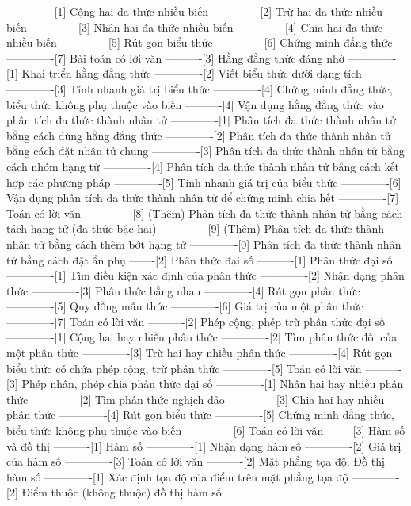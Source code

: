 -------------[1] Cộng hai đa thức nhiều biến
-------------[2] Trừ hai đa thức nhiều biến
-------------[3] Nhân hai đa thức nhiều biến
-------------[4] Chia hai đa thức nhiều biến
-------------[5] Rút gọn biểu thức
-------------[6] Chứng minh đẳng thức
-------------[7] Bài toán có lời văn
----------[3] Hằng đẳng thức đáng nhớ
-------------[1] Khai triển hằng đẳng thức
-------------[2] Viết biểu thức dưới dạng tích
-------------[3] Tính nhanh giá trị biểu thức
-------------[4] Chứng minh đẳng thức, biểu thức không phụ thuộc vào biến
----------[4] Vận dụng hằng đẳng thức vào phân tích đa thức thành nhân tử
-------------[1] Phân tích đa thức thành nhân tử bằng cách dùng hằng đẳng thức
-------------[2] Phân tích đa thức thành nhân tử bằng cách đặt nhân tử chung
-------------[3] Phân tích đa thức thành nhân tử bằng cách nhóm hạng tử
-------------[4] Phân tích đa thức thành nhân tử bằng cách kết hợp các phương pháp
-------------[5] Tính nhanh giá trị của biểu thức
-------------[6] Vận dụng phân tích đa thức thành nhân tử để chứng minh chia hết
-------------[7] Toán có lời văn
-------------[8] (Thêm) Phân tích đa thức thành nhân tử bằng cách tách hạng tử (đa thức bậc hai)
-------------[9] (Thêm) Phân tích đa thức thành nhân tử bằng cách thêm bớt hạng tử
-------------[0] Phân tích đa thức thành nhân tử bằng cách đặt ẩn phụ
-------[2] Phân thức đại số
----------[1] Phân thức đại số
-------------[1] Tìm điều kiện xác định của phân thức
-------------[2] Nhận dạng phân thức
-------------[3] Phân thức bằng nhau
-------------[4] Rút gọn phân thức
-------------[5] Quy đồng mẫu thức
-------------[6] Giá trị của một phân thức
-------------[7] Toán có lời văn
----------[2] Phép cộng, phép trừ phân thức đại số
-------------[1] Cộng hai hay nhiều phân thức
-------------[2] Tìm phân thức đối của một phân thức
-------------[3] Trừ hai hay nhiều phân thức
-------------[4] Rút gọn biểu thức có chứa phép cộng, trừ phân thức
-------------[5] Toán có lời văn
----------[3] Phép nhân, phép chia phân thức đại số
-------------[1] Nhân hai hay nhiều phân thức
-------------[2] Tìm phân thức nghịch đảo
-------------[3] Chia hai hay nhiều phân thức
-------------[4] Rút gọn biểu thức
-------------[5] Chứng minh đẳng thức, biểu thức không phụ thuộc vào biến
-------------[6] Toán có lời văn
-------[3] Hàm số và đồ thị
----------[1] Hàm số
-------------[1] Nhận dạng hàm số
-------------[2] Giá trị của hàm số
-------------[3] Toán có lời văn
----------[2] Mặt phẳng tọa độ. Đồ thị hàm số
-------------[1] Xác định tọa độ của điểm trên mặt phẳng tọa độ
-------------[2] Điểm thuộc (không thuộc) đồ thị hàm số
